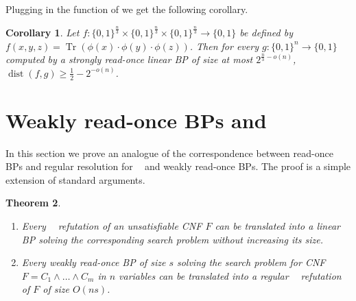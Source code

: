 \documentclass[a4paper,11pt,draft]{article}
\newtheorem{theorem}{Theorem}
\newtheorem{corollary}[theorem]{Corollary}
\theoremstyle{definition}
\theoremstyle{remark}
\DeclareMathOperator{\dist}{dist}
\DeclareMathOperator{\Tr}{Tr}
\DeclareMathOperator{\reslin}{\mathsf{Res}[\oplus]}
\newcommand{\todo}[1]{\textbf{TODO:} #1}
\newcommand{\Q}{{\{0,1\}}}
\newcommand{\sreadonce}{strongly read-once}
\newcommand{\wreadonce}{weakly read-once}
\newcommand{\Wreadonce}{Weakly read-once}
\begin{document}
Plugging in the function of  we get the following corollary.

\begin{corollary}
Let $f:\Q^{\frac{n}{3}}\times \Q^{\frac{n}{3}} \times \Q^{\frac{n}{3}} \rightarrow \Q$ be defined by $f(x,y,z) = \Tr(\phi(x) \cdot \phi(y) \cdot \phi(z))$. Then for every $g:\Q^n \rightarrow \Q$ computed by a \sreadonce{} linear BP of size at most $2^{\frac{n}{3} - o(n)}$, $\dist(f, g) \ge \frac{1}{2} - 2^{-o(n)}$.
\end{corollary}

\section{\texorpdfstring{\Wreadonce{} BPs and $\reslin$}{\Wreadonce{} BPs and Res[+]}}

In this section we prove an analogue of the correspondence between read-once BPs and regular resolution for $\reslin$ and \wreadonce{} BPs. The proof is a simple extension of standard arguments.

\begin{theorem}\label{thm:res-bp}\leavevmode
  \begin{enumerate}
      \item Every $\reslin$ refutation of an unsatisfiable CNF $F$ can be translated into a linear BP solving the corresponding search problem without increasing its size.

      \item Every \wreadonce{} BP of size $s$ solving the search problem for CNF $F = C_1 \wedge \ldots \wedge C_m$ in $n$ variables can be translated into a regular $\reslin$ refutation of $F$ of size $O(ns)$.
  \end{enumerate}
\end{theorem}
\end{document}
